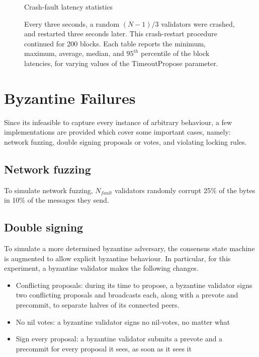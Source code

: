 \begin{figure}[]
	Crash-fault latency statistics	
	
	\caption[Latency statistics under crash faults]{Every three seconds, a random $(N-1)/3$ validators were crashed, and restarted three seconds later. This crash-restart procedure continued for 200 blocks. Each table reports the minimum, maximum, average, median, and $95^{th}$ percentile of the block latencies, for varying values of the TimeoutPropose parameter.}
	\label{fig:exp:crash_failure}
\end{figure}


\section{Byzantine Failures}

Since its infeasible to capture every instance of arbitrary behaviour,
a few implementations are provided which cover some important cases, namely:
network fuzzing, double signing proposals or votes, and violating locking rules.

\subsection{Network fuzzing}

To simulate network fuzzing, $N_{fault}$ validators randomly corrupt 25\% of the bytes in 10\% of the messages they send.

\subsection{Double signing}

To simulate a more determined byzantine adversary, the consensus state machine is augmented to allow explicit byzantine behaviour.
In particular, for this experiment, a byzantine validator makes the following changes.

\begin{itemize}
\item{Conflicting proposals: during its time to propose, a byzantine validator signs two conflicting proposals and broadcasts each, along with a prevote and precommit, to separate halves of its connected peers.} 
\item{No nil votes: a byzantine validator signs no nil-votes, no matter what}
\item{Sign every proposal: a byzantine validator submits a prevote and a precommit for every proposal it sees, as soon as it sees it}
\end{itemize}

